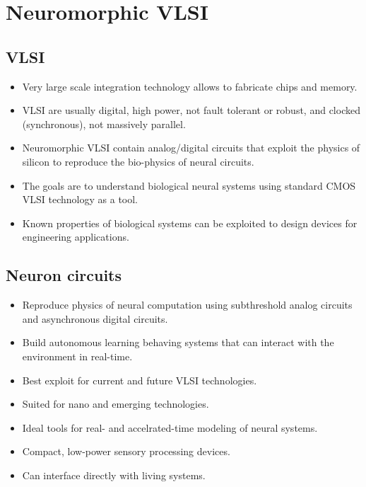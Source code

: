\documentclass[main]{subfiles}
\begin{document}

\section{Neuromorphic VLSI}
\subsection{VLSI}
\begin{itemize}[noitemsep,nolistsep]
	\item Very large scale integration technology allows to fabricate chips and memory.
	\item VLSI are usually digital, high power, not fault tolerant or robust, and clocked (synchronous), not massively parallel.
	\item Neuromorphic VLSI contain analog/digital circuits that exploit the physics of silicon to reproduce the bio-physics of neural circuits.
	\item The goals are to understand biological neural systems using standard CMOS VLSI technology as a tool.
	\item Known properties of biological systems can be exploited to design devices for engineering applications.
\end{itemize}

\subsection{Neuron circuits}
\begin{itemize}[noitemsep,nolistsep]
	\item Reproduce physics of neural computation using subthreshold analog circuits and asynchronous digital circuits.
	\item Build autonomous learning behaving systems that can interact with the environment in real-time.
	\item Best exploit for current and future VLSI technologies.
	\item Suited for nano and emerging technologies.
	\item Ideal tools for real- and accelrated-time modeling of neural systems.
	\item Compact, low-power sensory processing devices.
	\item Can interface directly with living systems.
\end{itemize}
\end{document}
